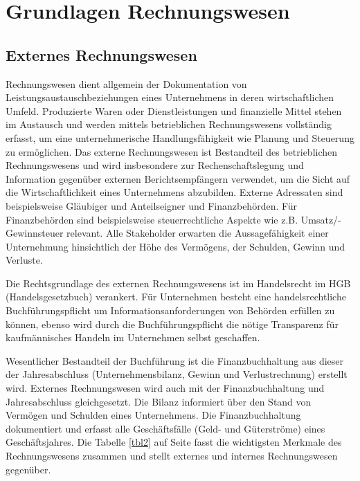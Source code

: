 \section{Grundlagen Rechnungswesen}

\subsection{Externes Rechnungswesen}
\label{ssec:externesRechnungswesen}
Rechnungswesen dient allgemein der Dokumentation von Leistungsaustauschbeziehungen eines Unternehmens in deren wirtschaftlichen Umfeld. Produzierte Waren oder Dienstleistungen und finanzielle Mittel stehen im Austausch und werden mittels betrieblichen Rechnungswesens vollständig erfasst, um eine unternehmerische Handlungsfähigkeit wie Planung und Steuerung zu ermöglichen. Das externe Rechnungswesen ist Bestandteil des betrieblichen Rechnungswesens und wird insbesondere zur Rechenschaftslegung und Information gegenüber externen Berichtsempfängern verwendet, um die Sicht auf die Wirtschaftlichkeit eines Unternehmens abzubilden. Externe Adressaten sind beispielsweise Gläubiger und Anteilseigner und Finanzbehörden. Für Finanzbehörden sind beispielsweise steuerrechtliche Aspekte wie z.B. Umsatz/- Gewinnsteuer relevant. Alle Stakeholder erwarten die Aussagefähigkeit einer Unternehmung hinsichtlich der Höhe des Vermögens, der Schulden, Gewinn und Verluste. 

Die Rechtsgrundlage des externen Rechnungswesens ist im Handelsrecht im  HGB (Handelsgesetzbuch) verankert. Für Unternehmen besteht eine handelsrechtliche \\Buchführungspflicht um Informationsanforderungen von Behörden erfüllen zu können, ebenso wird durch die Buchführungspflicht die nötige Transparenz für kaufmännisches Handeln im Unternehmen selbst geschaffen.

Wesentlicher Bestandteil der Buchführung ist die Finanzbuchhaltung aus dieser der Jahresabschluss (Unternehmensbilanz,  Gewinn und Verlustrechnung) erstellt wird. Externes Rechnungswesen wird auch mit der Finanzbuchhaltung und Jahresabschluss gleichgesetzt. Die Bilanz informiert über den Stand von Vermögen und Schulden eines Unternehmens. Die Finanzbuchhaltung dokumentiert
und erfasst alle Geschäftsfälle (Geld- und Güterströme) eines Geschäftsjahres.
Die Tabelle \ref{tbl2} auf Seite \pageref{tbl2} fasst die wichtigsten Merkmale des Rechnungswesens zusammen und stellt externes und internes Rechnungswesen gegenüber.

